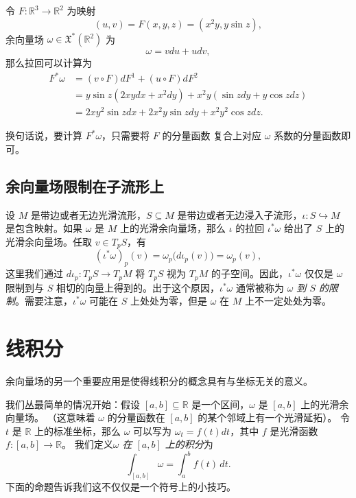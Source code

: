 \begin{example}
  令 $F:\mathbb{R}^3\to \mathbb{R}^2$ 为映射
  \[
    (u,v)=F(x,y,z) =(x^2y,y\sin z),
  \]
  余向量场 $\omega\in \mathfrak{X}^*(\mathbb{R}^2)$ 为
  \[
    \omega=vdu+udv,  
  \]
  那么拉回可以计算为
  \begin{align*}
    F^*\omega&=(v\circ F)dF^1+(u\circ F)dF^2\\
    &=y\sin z (2xydx+x^2dy)+x^2y(\sin zdy+y\cos zdz)\\
    &=2xy^2\sin z dx+2x^2y\sin zdy+x^2y^2\cos zdz.
  \end{align*}
\end{example}

换句话说，要计算 $F^*\omega$，只需要将 $F$ 的分量函数
复合上对应 $\omega$ 系数的分量函数即可。

\subsection{余向量场限制在子流形上}

设 $M$ 是带边或者无边光滑流形，$S\subseteq M$ 是带边或者无边浸入子流形，$\iota:S\hookrightarrow M$
是包含映射。如果 $\omega$ 是 $M$ 上的光滑余向量场，那么 $\iota$ 的拉回 $\iota^*\omega$ 给出了
$S$ 上的光滑余向量场。任取 $v\in T_pS$，有
\[
  (\iota^*\omega)_p(v)=\omega_p\bigl(d\iota_p(v)\bigr)=\omega_p(v),
\]
这里我们通过 $d\iota_p:T_pS\to T_pM$ 将 $T_pS$ 视为 $T_pM$ 的子空间。因此，$\iota^*\omega$
仅仅是 $\omega$ 限制到与 $S$ 相切的向量上得到的。出于这个原因，$\iota^*\omega$ 通常被称为
\emph{$\omega$ 到 $S$ 的限制}。需要注意，$\iota^*\omega$ 可能在 $S$ 上处处为零，但是 $\omega$
在 $M$ 上不一定处处为零。



\section{线积分}\label{sec:line integral}

余向量场的另一个重要应用是使得线积分的概念具有与坐标无关的意义。

我们丛最简单的情况开始：假设 $[a,b]\subseteq \mathbb{R}$
是一个区间，$\omega$ 是 $[a,b]$ 上的光滑余向量场。
（这意味着 $\omega$ 的分量函数在 $[a,b]$ 的某个邻域上有一个光滑延拓）。
令 $t$ 是 $\mathbb{R}$ 上的标准坐标，那么 $\omega$ 可以写为
$\omega_t=f(t)dt$，其中 $f$ 是光滑函数 $f:[a,b]\to \mathbb{R}$。
我们定义\emph{$\omega$ 在 $[a,b]$ 上的积分}为
\[
  \int_{[a,b]}\omega=\int_a^b f(t) \, dt.  
\]
下面的命题告诉我们这不仅仅是一个符号上的小技巧。

